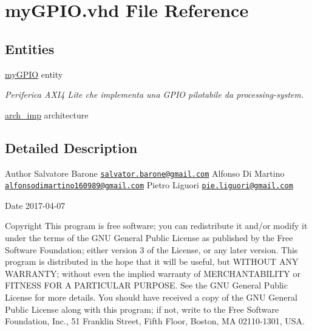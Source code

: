 \hypertarget{my_g_p_i_o_8vhd}{\section{my\+G\+P\+I\+O.\+vhd File Reference}
\label{my_g_p_i_o_8vhd}
}
\subsection*{Entities}
\begin{DoxyCompactItemize}
\item 
\hyperlink{classmy_g_p_i_o}{my\+G\+P\+I\+O} entity
\begin{DoxyCompactList}\small\item\em Periferica A\+X\+I4 Lite che implementa una G\+P\+I\+O pilotabile da processing-\/system. \end{DoxyCompactList}\item 
\hyperlink{classmy_g_p_i_o_1_1arch__imp}{arch\+\_\+imp} architecture
\end{DoxyCompactItemize}


\subsection{Detailed Description}
\begin{DoxyAuthor}{Author}
Salvatore Barone \href{mailto:salvator.barone@gmail.com}{\tt salvator.\+barone@gmail.\+com} Alfonso Di Martino \href{mailto:alfonsodimartino160989@gmail.com}{\tt alfonsodimartino160989@gmail.\+com} Pietro Liguori \href{mailto:pie.liguori@gmail.com}{\tt pie.\+liguori@gmail.\+com} 
\end{DoxyAuthor}
\begin{DoxyDate}{Date}
2017-\/04-\/07 
\end{DoxyDate}
\begin{DoxyCopyright}{Copyright}
This program is free software; you can redistribute it and/or modify it under the terms of the G\+N\+U General Public License as published by the Free Software Foundation; either version 3 of the License, or any later version. This program is distributed in the hope that it will be useful, but W\+I\+T\+H\+O\+U\+T A\+N\+Y W\+A\+R\+R\+A\+N\+T\+Y; without even the implied warranty of M\+E\+R\+C\+H\+A\+N\+T\+A\+B\+I\+L\+I\+T\+Y or F\+I\+T\+N\+E\+S\+S F\+O\+R A P\+A\+R\+T\+I\+C\+U\+L\+A\+R P\+U\+R\+P\+O\+S\+E. See the G\+N\+U General Public License for more details. You should have received a copy of the G\+N\+U General Public License along with this program; if not, write to the Free Software Foundation, Inc., 51 Franklin Street, Fifth Floor, Boston, M\+A 02110-\/1301, U\+S\+A. 
\end{DoxyCopyright}
